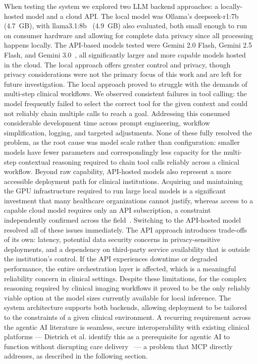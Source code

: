 \documentclass[conference]{IEEEtran}
\begin{document}
When testing the system we explored two LLM backend approaches: a locally-hosted model and a cloud API. The local model was Ollama's deepseek-r1:7b~\cite{deepseekr1} (4.7~GB), with llama3.1:8b~\cite{llama31} (4.9~GB) also evaluated, both small enough to run on consumer hardware and allowing for complete data privacy since all processing happens locally. The API-based models tested were Gemini 2.0 Flash, Gemini 2.5 Flash, and Gemini 3.0~\cite{gemini2025}, all significantly larger and more capable models hosted in the cloud. The local approach offers greater control and privacy, though privacy considerations were not the primary focus of this work and are left for future investigation.
The local approach proved to struggle with the demands of multi-step clinical workflows. We observed consistent failures in tool calling: the model frequently failed to select the correct tool for the given context and could not reliably chain multiple calls to reach a goal. Addressing this consumed considerable development time across prompt engineering, workflow simplification, logging, and targeted adjustments. None of these fully resolved the problem, as the root cause was model scale rather than configuration: smaller models have fewer parameters and correspondingly less capacity for the multi-step contextual reasoning required to chain tool calls reliably across a clinical workflow. Beyond raw capability, API-hosted models also represent a more accessible deployment path for clinical institutions. Acquiring and maintaining the GPU infrastructure required to run large local models is a significant investment that many healthcare organizations cannot justify, whereas access to a capable cloud model requires only an API subscription, a constraint independently confirmed across the field~\cite{agiformedicalimaging2025}. Switching to the API-hosted model resolved all of these issues immediately. The API approach introduces trade-offs of its own: latency, potential data security concerns in privacy-sensitive deployments, and a dependency on third-party service availability that is outside the institution's control. If the API experiences downtime or degraded performance, the entire orchestration layer is affected, which is a meaningful reliability concern in clinical settings. Despite these limitations, for the complex reasoning required by clinical imaging workflows it proved to be the only reliably viable option at the model sizes currently available for local inference. The system architecture supports both backends, allowing deployment to be tailored to the constraints of a given clinical environment. A recurring requirement across the agentic AI literature is seamless, secure interoperability with existing clinical platforms — Dietrich et al. identify this as a prerequisite for agentic AI to function without disrupting care delivery~\cite{dietrich2025agentic} — a problem that MCP directly addresses, as described in the following section.
\end{document}
